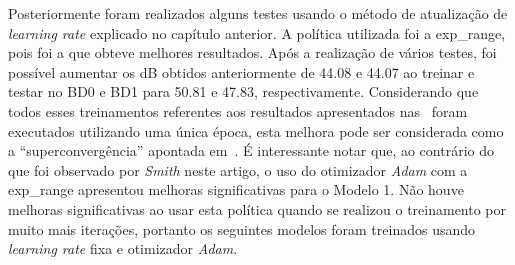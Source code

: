 Posteriormente foram realizados alguns testes usando o método de atualização de \textit{learning rate} explicado no capítulo anterior. A política utilizada foi a exp\_range, pois foi a que obteve melhores resultados. Após a realização de vários testes, foi possível aumentar os \acrshort{dB} obtidos anteriormente de 44.08 e 44.07 ao treinar e testar no BD0 e BD1 para 50.81 e 47.83, respectivamente. Considerando que todos esses treinamentos referentes aos resultados apresentados nas~ foram executados utilizando uma única época, esta melhora pode ser considerada como a ``superconvergência'' apontada em~\cite{smith2017cyclical}. É interessante notar que, ao contrário do que foi observado por \textit{Smith} neste artigo, o uso do otimizador \textit{Adam} com a exp\_range apresentou melhoras significativas para o Modelo 1. Não houve melhoras significativas ao usar esta política quando se realizou o treinamento por muito mais iterações, portanto os seguintes modelos foram treinados usando \textit{learning rate} fixa e otimizador \textit{Adam}. 

